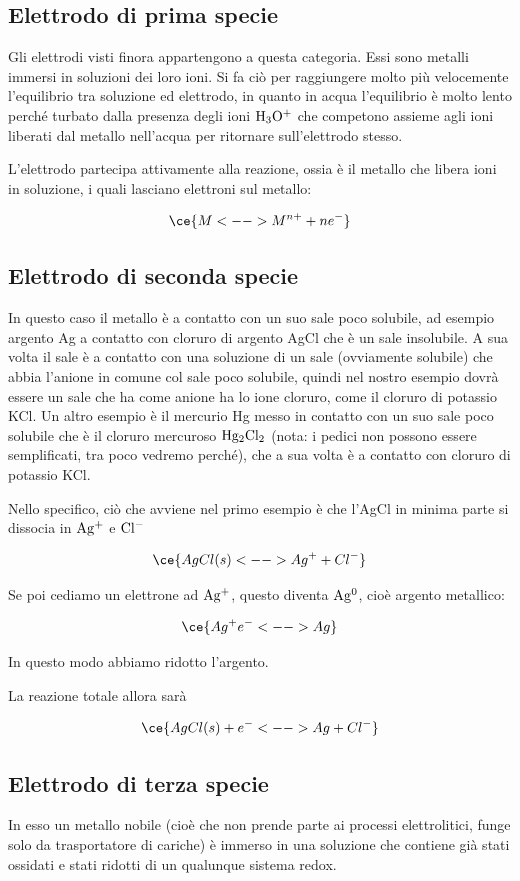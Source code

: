 \subsection{Elettrodo di prima specie}
Gli elettrodi visti finora appartengono a questa categoria. Essi sono metalli immersi in soluzioni dei loro ioni. Si fa ciò per raggiungere molto più velocemente l'equilibrio tra soluzione ed elettrodo, in quanto in acqua l'equilibrio è molto lento perché turbato dalla presenza degli ioni $\rm H_3O^+$ che competono assieme agli ioni liberati dal metallo nell'acqua per ritornare sull'elettrodo stesso.

L'elettrodo partecipa attivamente alla reazione, ossia è il metallo che libera ioni in soluzione, i quali lasciano elettroni sul metallo:

$$\ce{M <--> M^{n+} + ne^-}$$
\subsection{Elettrodo di seconda specie}
In questo caso il metallo è a contatto con un suo sale poco solubile, ad esempio argento Ag a contatto con cloruro di argento AgCl che è un sale insolubile. A sua volta il sale è a contatto con una soluzione di un sale (ovviamente solubile) che abbia l'anione in comune col sale poco solubile, quindi nel nostro esempio dovrà essere un sale che ha come anione ha lo ione cloruro, come il cloruro di potassio KCl. Un altro esempio è il mercurio Hg messo in contatto con un suo sale poco solubile che è il cloruro mercuroso $\rm Hg_2Cl_2$ (nota: i pedici non possono essere semplificati, tra poco vedremo perché), che a sua volta è a contatto con cloruro di potassio KCl.

Nello specifico, ciò che avviene nel primo esempio è che l'AgCl in minima parte si dissocia in $\rm Ag^+$ e $\rm Cl^-$

$$\ce{AgCl(s) <--> Ag^+ + Cl^-}$$

Se poi cediamo un elettrone ad $\rm Ag^+$, questo diventa $\rm Ag^0$, cioè argento metallico:

$$\ce{Ag^+ e^- <--> Ag}$$

In questo modo abbiamo ridotto l'argento.

La reazione totale allora sarà

$$\ce{AgCl(s) + e^- <--> Ag + Cl^-}$$
\subsection{Elettrodo di terza specie}
In esso un metallo nobile (cioè che non prende parte ai processi elettrolitici, funge solo da trasportatore di cariche) è immerso in una soluzione che contiene già stati ossidati e stati ridotti di un qualunque sistema redox.

